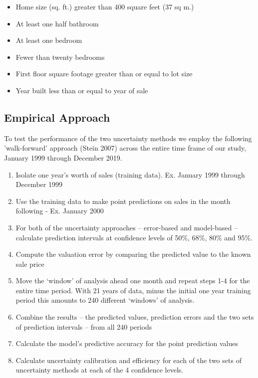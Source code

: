 \documentclass[colTwo]{anon}
\theoremstyle{definition}
\begin{document}
\begin{itemize}
\item Home size (sq. ft.) greater than 400 square feet (37 sq m.)
\item At least one half bathroom
\item At least one bedroom
\item Fewer than twenty bedrooms
\item First floor square footage greater than or equal to lot size
\item Year built less than or equal to year of sale
\end{itemize}

\subsection{Empirical Approach}

To test the performance of the two uncertainty methods we employ the following 'walk-forward' approach (Stein 2007) across the entire time frame of our study, January 1999 through December 2019.

\begin{enumerate}
\item Isolate one year’s worth of sales (training data). Ex. January 1999 through December 1999
\item Use the training data to make point predictions on sales in the month following - Ex. January 2000
\item For both of the uncertainty approaches -- error-based and model-based -- calculate prediction intervals at confidence levels of 50\%, 68\%, 80\% and 95\%.
\item Compute the valuation error by comparing the predicted value to the known sale price
\item Move the ‘window’ of analysis ahead one month and repeat steps 1-4 for the entire time period.  With 21 years of data, minus the initial one year training period this amounts to 240 different ‘windows’ of analysis.
\item Combine the results -- the predicted values, prediction errors and the two sets of prediction intervals -- from all 240 periods
\item Calculate the model’s predictive accuracy for the point prediction values
\item Calculate uncertainty calibration and efficiency for each of the two sets of uncertainty methods at each of the 4 confidence levels.
\end{enumerate}
\end{document}
